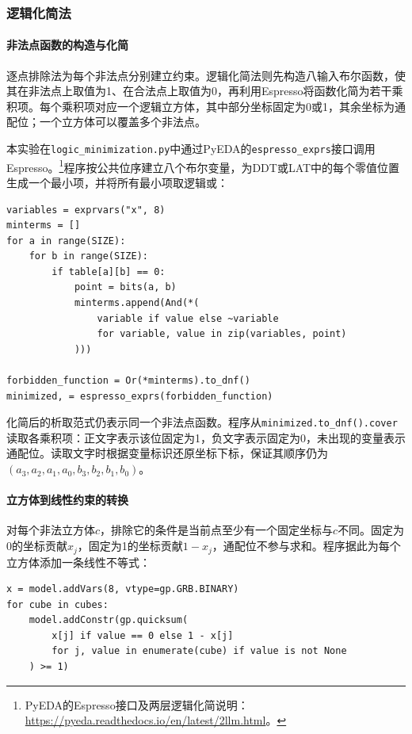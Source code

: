 \clearpage
\subsubsection{逻辑化简法}
\label{subsubsec:lab4-task1-logic-minimization}

\paragraph{非法点函数的构造与化简}

逐点排除法为每个非法点分别建立约束。逻辑化简法则先构造八输入布尔函数，使其在非法点上取值为1、在合法点上取值为0，再利用Espresso将函数化简为若干乘积项。每个乘积项对应一个逻辑立方体，其中部分坐标固定为0或1，其余坐标为通配位；一个立方体可以覆盖多个非法点。

本实验在\texttt{logic\_minimization.py}中通过PyEDA的\texttt{espresso\_exprs}接口调用Espresso。\footnote{PyEDA的Espresso接口及两层逻辑化简说明：\url{https://pyeda.readthedocs.io/en/latest/2llm.html}。}程序按公共位序建立八个布尔变量，为DDT或LAT中的每个零值位置生成一个最小项，并将所有最小项取逻辑或：
\par\noindent\begin{minipage}{\linewidth}
\begin{lstlisting}
variables = exprvars("x", 8)
minterms = []
for a in range(SIZE):
    for b in range(SIZE):
        if table[a][b] == 0:
            point = bits(a, b)
            minterms.append(And(*(
                variable if value else ~variable
                for variable, value in zip(variables, point)
            )))

forbidden_function = Or(*minterms).to_dnf()
minimized, = espresso_exprs(forbidden_function)
\end{lstlisting}
\end{minipage}\par

化简后的析取范式仍表示同一个非法点函数。程序从\texttt{minimized.to\_dnf().cover}读取各乘积项：正文字表示该位固定为1，负文字表示固定为0，未出现的变量表示通配位。读取文字时根据变量标识还原坐标下标，保证其顺序仍为$(a_3,a_2,a_1,a_0,b_3,b_2,b_1,b_0)$。

\paragraph{立方体到线性约束的转换}

对每个非法立方体$c$，排除它的条件是当前点至少有一个固定坐标与$c$不同。固定为0的坐标贡献$x_j$，固定为1的坐标贡献$1-x_j$，通配位不参与求和。程序据此为每个立方体添加一条线性不等式：
\begin{lstlisting}
x = model.addVars(8, vtype=gp.GRB.BINARY)
for cube in cubes:
    model.addConstr(gp.quicksum(
        x[j] if value == 0 else 1 - x[j]
        for j, value in enumerate(cube) if value is not None
    ) >= 1)
\end{lstlisting}

